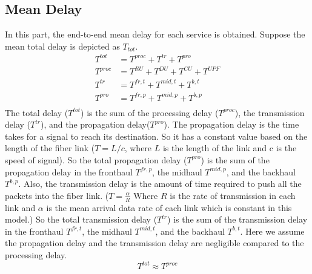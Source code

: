 \documentclass[conference]{IEEEtran}
\begin{document}
\subsection{Mean Delay}
In this part, the end-to-end mean delay for each service is obtained.
Suppose the mean total delay is depicted as $T_{tot}$.
\begin{equation}
\begin{split}
T^{tot} &=  T^{proc} + T^{tr} + T^{pro}\\
T^{proc} &=  T^{RU} + T^{DU} + T^{CU} + T^{UPF}\\
T^{tr} &= T^{fr,t} + T^{mid,t} + T^{b,t}  \\
T^{pro} &= T^{fr,p} + T^{mid,p} + T^{b,p}  \\
\end{split}
\end{equation}
The total delay ($T^{tot}$) is the sum of the processing delay ($T^{proc}$), the transmission delay ($T^{tr}$), and the propagation delay($T^{pro}$). 
The propagation delay is the time takes for a signal to reach its destination. So it has a constant value based on the length of the fiber link ($T = L/c$, where $L$ is the length of the link and c is the speed of signal). So the total propagation delay ($T^{pro}$) is the sum of the propagation delay in the fronthaul $T^{fr,p}$, the midhaul $T^{mid,p}$, and the backhaul $T^{b,p}$.
Also, the transmission delay is the amount of time required to push all the packets into the fiber link. 
($T = \frac{\alpha}{R}$ Where $R$ is the rate of transmission in each link and $\alpha$ is the mean arrival data rate of each link which is constant in this model.) 
So the total transmission delay ($T^{tr}$) is the sum of the transmission delay in the fronthaul $T^{fr,t}$, the midhaul $T^{mid,t}$, and the backhaul $T^{b,t}$.
Here we assume the propagation delay and the transmission delay are negligible compared to the processing delay.
\begin{equation}
T^{tot} \approx T^{proc}
\end{equation}
\end{document}
